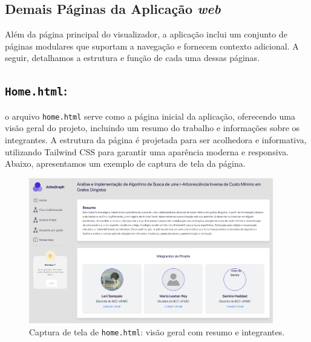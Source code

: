 

\subsection{Demais Páginas da Aplicação \textit{web}}
Além da página principal do visualizador, a aplicação inclui um conjunto de páginas modulares que suportam a navegação e fornecem contexto adicional. A seguir, detalhamos a estrutura e função de cada uma dessas páginas.

\subsection{\texttt{Home.html}:} o arquivo \texttt{home.html} serve como a página inicial da aplicação, oferecendo uma visão geral do projeto, incluindo um resumo do trabalho e informações sobre os integrantes. A estrutura da página é projetada para ser acolhedora e informativa, utilizando Tailwind CSS para garantir uma aparência moderna e responsiva. Abaixo, apresentamos um exemplo de captura de tela da página.

\begin{figure}[H]\centering
	\includegraphics[width=0.95\textwidth]{../assets/homehtml.png}
	\caption{Captura de tela de \texttt{home.html}: visão geral com resumo e integrantes.}
	\label{fig:home_html_screenshot}
\end{figure}


